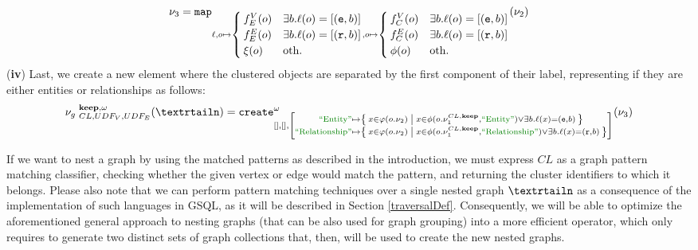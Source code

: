 \begin{definition}
	\[\nu_3=\texttt{map}_{\ell,o\mapsto\begin{cases}
		f_E^V(o) & \exists b. \ell(o)=[(\texttt{e},b)]\\
		f_E^E(o) & \exists b. \ell(o)=[(\texttt{r},b)]\\
		\xi(o) & \textup{oth.}\\
		\end{cases},o\mapsto\begin{cases}
		f_C^V(o) & \exists b. \ell(o)=[(\texttt{e},b)]\\
		f_C^E(o) & \exists b. \ell(o)=[(\texttt{r},b)]\\
		\phi(o) & \textup{oth.}\\
		\end{cases}}(\nu_2)\]
	(\textbf{iv}) Last, we create a new element where the clustered objects are separated by the first component of their label, representing if they are either entities or relationships as follows:
	\[{\nu_g\;}^{\textbf{keep},\omega}_{CL,UDF_V,UDF_E}(\nested)=\texttt{create}_{[],[],\left[\substack{\ONTA\mapsto \Set{x\in\varphi(o.\nu_2)|x\in \phi(o.\nu_1^{CL,\textbf{keep}},\ONTA)\vee\exists b. \ell(x)=(\texttt{e},b)}\\ \RELA\mapsto \Set{x\in\varphi(o.\nu_2)|x\in \phi(o.\nu_1^{CL,\textbf{keep}},\RELA)\vee\exists b. \ell(x)=(\texttt{r},b)}}\right]}^\omega(\nu_3)\]
	
\end{definition}

If we want to nest a graph by using the matched patterns as described in the introduction, we must express $CL$ as a graph pattern matching classifier, checking whether the given vertex or edge would match the pattern, and returning the cluster identifiers to which it belongs.   Please also note that we can perform  pattern matching techniques over a single nested graph $\nested$ as a consequence of the implementation of such languages in GSQL, as it will be described in Section \vref{traversalDef}. Consequently, we will be able to  optimize the aforementioned general approach to nesting graphs (that can be also used for graph grouping) into a more efficient operator, which only requires to generate two distinct sets of graph collections that, then, will be used to create the new nested graphs.

